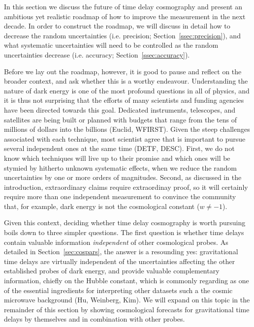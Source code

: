 


In this section we discuss the future of time delay cosmography and
present an ambitious yet realistic roadmap of how to improve the
measurement in the next decade. In order to construct the roadmap, we
will discuss in detail how to decrease the random uncertainties
(i.e. precision; Section~\ref{ssec:precision}), and what systematic
uncertainties will need to be controlled as the random uncertainties
decrease (i.e. accuracy; Section~\ref{ssec:accuracy}).

Before we lay out the roadmap, however, it is good to pause and
reflect on the broader context, and ask whether this is a worthy
endeavour.  Understanding the nature of dark energy is one of the most
profound questions in all of physics, and it is thus not surprising
that the efforts of many scientists and funding agencies have been
directed towards this goal. Dedicated instruments, telescopes, and
satellites are being built or planned with budgets that range from the
tens of millions of dollars into the billions (Euclid, WFIRST). Given
the steep challenges associated with each technique, most scientist
agree that is important to pursue several independent ones at the same
time (DETF, DESC). First, we do not know which techniques will live up
to their promise and which ones will be stymied by hitherto unknown
systematic effects, when we reduce the random uncertainties by one or
more orders of magnitudes. Second, as discussed in the introduction,
extraordinary claims require extraordinay proof, so it will certainly
require more than one independent measurement to convince the
community that, for example, dark energy is not the cosmological
constant ($w\neq-1$).

Given this context, deciding whether time delay cosmography is worth
pursuing boils down to three simpler questions. The first question is
whether time delays contain valuable information {\it independent} of
other cosmological probes. As detailed in Section~\ref{sec:cospars},
the answer is a resounding yes: gravitational time delays are
virtually independent of the uncertainties affecting the other
established probes of dark energy, and provide valuable complementary
information, chiefly on the Hubble constant, which is commonly
regarding as one of the essential ingredients for interpreting other
datasets such a the cosmic microwave background (Hu, Weinberg, Kim).
We will expand on this topic in the remainder of this section by
showing cosmological forecasts for gravitational time delays by
themselves and in combination with other probes.

